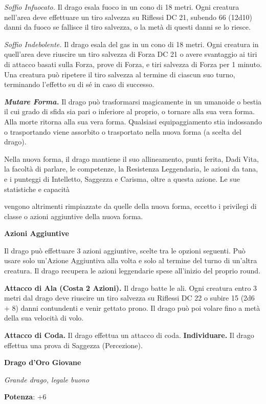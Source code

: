 \begin{multicols}{2}
\emph{Soffio Infuocato.} Il drago esala fuoco in un cono di 18 metri.
Ogni creatura nell'area deve effettuare un tiro salvezza su Riflessi DC
21, subendo 66 (12d10) danni da fuoco se fallisce il tiro salvezza, o la
metà di questi danni se lo riesce.

\emph{Soffio Indebolente.} Il drago esala del gas in un cono di 18
metri. Ogni creatura in quell'area deve riuscire un tiro salvezza di Forza DC 21 o avere svantaggio ai tiri di attacco basati sulla Forza,
prove di Forza, e tiri salvezza di Forza per 1 minuto. Una creatura può
ripetere il tiro salvezza al termine di ciascun suo turno, terminando
l'effetto su di sé in caso di successo.

\emph{\textbf{Mutare Forma.}} Il drago può trasformarsi magicamente in
un umanoide o bestia il cui grado di sfida sia pari o inferiore al
proprio, o tornare alla sua vera forma. Alla morte ritorna alla sua vera
forma. Qualsiasi equipaggiamento stia indossando o trasportando viene
assorbito o trasportato nella nuova forma (a scelta del drago).

Nella nuova forma, il drago mantiene il suo allineamento, punti ferita,
Dadi Vita, la facoltà di parlare, le competenze, la Resistenza
Leggendaria, le azioni da tana, e i punteggi di Intelletto, Saggezza e
Carisma, oltre a questa azione. Le sue statistiche e capacità

vengono altrimenti rimpiazzate da quelle della nuova forma, eccetto i
privilegi di classe o azioni aggiuntive della nuova forma.

\textbf{Azioni Aggiuntive}

Il drago può effettuare 3 azioni aggiuntive, scelte tra le opzioni
seguenti. Può usare solo un'Azione Aggiuntiva alla volta e solo al
termine del turno di un'altra creatura. Il drago recupera le azioni
leggendarie spese all'inizio del proprio round.

\textbf{Attacco di Ala (Costa 2 Azioni).} Il drago batte le ali. Ogni
creatura entro 3 metri dal drago deve riuscire un tiro salvezza su Riflessi DC 22 o subire 15 (2d6 + 8) danni contundenti e venir gettato
prono. Il drago può poi volare fino a metà della sua velocità di volo.

\textbf{Attacco di Coda.} Il drago effettua un attacco di coda.
\textbf{Individuare.} Il drago effettua una prova di Saggezza
(Percezione).

\textbf{Drago d'Oro Giovane}

\emph{Grande drago, legale buono}

\textbf{Potenza}: +6


\end{multicols}
